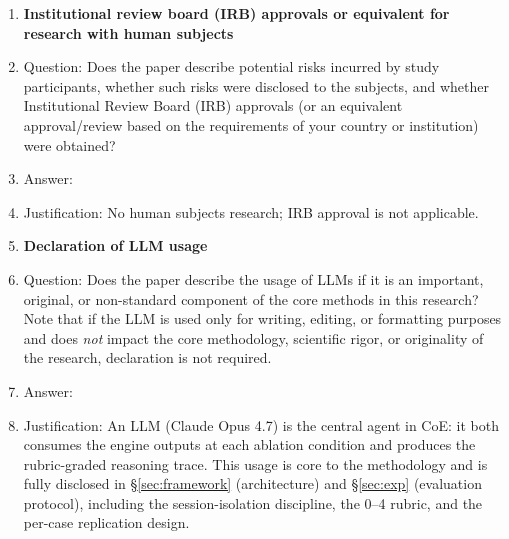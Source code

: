 \begin{enumerate}
\item {\bf Institutional review board (IRB) approvals or equivalent for research with human subjects}
    \item[] Question: Does the paper describe potential risks incurred by study participants, whether such risks were disclosed to the subjects, and whether Institutional Review Board (IRB) approvals (or an equivalent approval/review based on the requirements of your country or institution) were obtained?
    \item[] Answer: \answerNA{}
    \item[] Justification: No human subjects research; IRB approval is not applicable.

\item {\bf Declaration of LLM usage}
    \item[] Question: Does the paper describe the usage of LLMs if it is an important, original, or non-standard component of the core methods in this research? Note that if the LLM is used only for writing, editing, or formatting purposes and does \emph{not} impact the core methodology, scientific rigor, or originality of the research, declaration is not required.
    \item[] Answer: \answerYes{}
    \item[] Justification: An LLM (Claude Opus 4.7) is the central agent in CoE: it both consumes the engine outputs at each ablation condition and produces the rubric-graded reasoning trace. This usage is core to the methodology and is fully disclosed in \S\ref{sec:framework} (architecture) and \S\ref{sec:exp} (evaluation protocol), including the session-isolation discipline, the 0--4 rubric, and the per-case replication design.

\end{enumerate}
